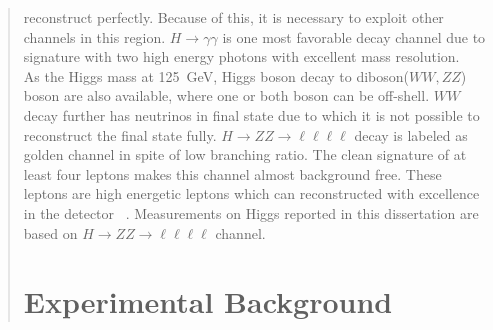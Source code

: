 \begin{abstract}
reconstruct perfectly. Because of this, it is necessary to exploit other channels in this region. $H \rightarrow \gamma\gamma$ is one most favorable decay channel due
to signature with two high energy photons with excellent mass resolution. \\
As the Higgs mass at 125~GeV, Higgs boson decay to diboson($WW, ZZ$) boson are also available, where one or both boson can be off-shell. $WW$ decay further has neutrinos in final state due to which it is not possible to reconstruct the final state fully. $H \rightarrow ZZ \rightarrow \ell\ell\ell\ell$ decay is labeled as golden channel in
spite of low branching ratio. The clean signature of at least four leptons makes this channel almost background free. These leptons are high energetic
leptons which can reconstructed with excellence in the detector ~\cite{Referenceb}. Measurements on Higgs reported in this dissertation are based on $H \rightarrow ZZ \rightarrow \ell\ell\ell\ell$ channel.


	\section{Experimental Background}\label{chinese_abstract_expbkg}


\end{abstract}
